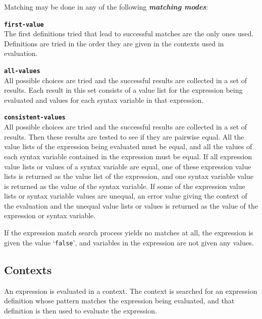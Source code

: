 \documentclass[12pt]{article}
\makeatletter
\newcommand{\skey}[2]{{\bf \em #1#2}\index{#1}}
\newcommand{\ttkey}[1]{{\tt \bf #1}\index{#1@{\tt #1}}}
\makeatother
\begin{document}
Matching may be done in any of the following \skey{matching mode}s:

\begin{list}{}{}

\item[\ttkey{first-value}]~\\
The first definitions tried that lead to successful matches are the only ones
used.  Definitions are tried in the order they are given in the contexts
used in evaluation.

\item[\ttkey{all-values}]~\\
All possible choices are tried and the
successful results are collected in a set of results.  Each result
in this set consists of a value list for the expression being evaluated
and values for each syntax variable in that expression.

\item[\ttkey{consistent-values}]~\\
All possible choices are tried and the
successful results are collected in a set of results.  Then these results
are tested to see if they are pairwise equal.
All the value lists of the expression
being evaluated must be equal, and all the values of each syntax variable
contained in the expression must be equal.  If all expression value lists or
values of a syntax variable are equal, one of these expression value lists
is returned as the value list of the expression, and one syntax variable value
is returned as the value of the syntax variable.
If some of the expression value lists or syntax variable values are unequal, an
error value giving the context of the evaluation and the unequal value lists
or values is returned as the value of the expression or syntax variable.

\end{list}

If the expression match search process yields no matches at all,
the expression is given the value `\verb|false|', and variables in the
expression are not given any values.

\subsection{Contexts}
\label{CONTEXTS}

An expression is evaluated in a context.  The context is searched
for an expression definition whose pattern matches the expression being
evaluated, and that definition is then used to evaluate the expression.
\end{document}
